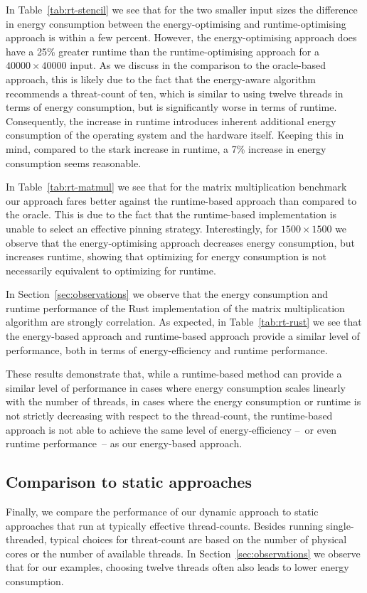 In Table~\ref{tab:rt-stencil} we see that for the two smaller input sizes the difference in energy
consumption between the energy-optimising and runtime-optimising approach is within a few percent.
However, the energy-optimising approach does have a 25\% greater runtime than the runtime-optimising
approach for a $40000 \times 40000$ input. As we discuss in the comparison to the oracle-based
approach, this is likely due to the fact that the energy-aware algorithm recommends a threat-count
of ten, which is similar to using twelve threads in terms of energy consumption, but is
significantly worse in terms of runtime. Consequently, the increase in runtime introduces inherent
additional energy consumption of the operating system and the hardware itself. Keeping this in mind,
compared to the stark increase in runtime, a 7\% increase in energy consumption seems reasonable.

In Table~\ref{tab:rt-matmul} we see that for the matrix multiplication benchmark our approach fares
better against the runtime-based approach than compared to the oracle. This is due to the fact that
the runtime-based implementation is unable to select an effective pinning strategy. Interestingly,
for $1500 \times 1500$ we observe that the energy-optimising approach decreases energy consumption,
but increases runtime, showing that optimizing for energy consumption is not necessarily equivalent
to optimizing for runtime.

In Section~\ref{sec:observations} we observe that the energy consumption and runtime performance of
the Rust implementation of the matrix multiplication algorithm are strongly correlation. As
expected, in Table~\ref{tab:rt-rust} we see that the energy-based approach and runtime-based
approach provide a similar level of performance, both in terms of energy-efficiency and runtime
performance.

These results demonstrate that, while a runtime-based method can provide a similar level of
performance in cases where energy consumption scales linearly with the number of threads, in cases
where the energy consumption or runtime is not strictly decreasing with respect to the thread-count,
the runtime-based approach is not able to achieve the same level of energy-efficiency --~or even
runtime performance~-- as our energy-based approach.

\subsection{Comparison to static approaches}\label{sec:evalation-static}
Finally, we compare the performance of our dynamic approach to static approaches that run at
typically effective thread-counts. Besides running single-threaded, typical choices for threat-count
are based on the number of physical cores or the number of available threads. In
Section~\ref{sec:observations} we observe that for our examples, choosing twelve threads often also
leads to lower energy consumption.

